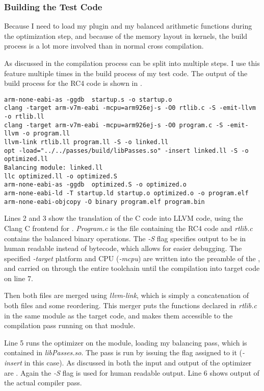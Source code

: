 \subsubsection{Building the Test Code}
\label{buildtest}
Because I need to load my plugin and my balanced arithmetic functions during the optimization step, and because of the memory layout in \qemu{} kernels, the build process is a lot more involved than in normal cross compilation.

As discussed in  the \llvm{} compilation process can be split into multiple steps.
I use this feature multiple times in the build process of my test code.
The output of the build process for the RC4 code is shown in .

\begin{lstlisting}[caption=Output of the Makefile, label=lst:makefile-output]
arm-none-eabi-as -ggdb  startup.s -o startup.o
clang -target arm-v7m-eabi -mcpu=arm926ej-s -O0 rtlib.c -S -emit-llvm -o rtlib.ll
clang -target arm-v7m-eabi -mcpu=arm926ej-s -O0 program.c -S -emit-llvm -o program.ll
llvm-link rtlib.ll program.ll -S -o linked.ll
opt -load="../../passes/build/libPasses.so" -insert linked.ll -S -o optimized.ll
Balancing module: linked.ll
llc optimized.ll -o optimized.S
arm-none-eabi-as -ggdb  optimized.S -o optimized.o
arm-none-eabi-ld -T startup.ld startup.o optimized.o -o program.elf
arm-none-eabi-objcopy -O binary program.elf program.bin
\end{lstlisting}

Lines 2 and 3 show the translation of the C code into LLVM code, using the Clang\cite{lattner2008llvm} C frontend for \llvm{}.
\emph{Program.c} is the file containing the RC4 code and \emph{rtlib.c} contains the balanced binary operations.
The \emph{-S} flag specifies output to be in human readable \ir{} instead of bytecode, which allows for easier debugging.
The specified \emph{-target} platform and CPU (\emph{-mcpu}) are written into the preamble of the \ir{}, and carried on through the entire toolchain until the compilation into target code on line 7.

Then both \llvm{} files are merged using \emph{llvm-link}, which is simply a concatenation of both files and some reordering.
This merger puts the functions declared in \emph{rtlib.c} in the same module as the target code, and makes them accessible to the compilation pass running on that module.

Line 5 runs the \llvm{} optimizer on the module, loading my balancing pass, which is contained in \emph{libPasses.so}.
The pass is run by issuing the flag assigned to it (\emph{-insert} in this case).
As discussed in  both the input and output of the optimizer are \ir{}.
Again the \emph{-S} flag is used for human readable output.
Line 6 shows output of the actual compiler pass.

